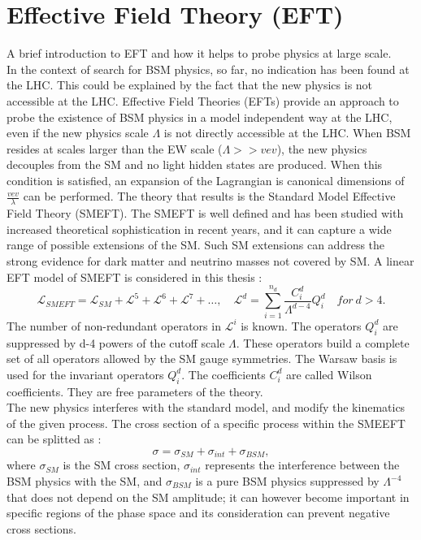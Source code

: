\section{Effective Field Theory (EFT)}
\label{chap1:EFT}
A brief introduction to EFT and how it helps to probe physics at large scale.\\

In the context of search for BSM physics, so far, no indication has been found at the LHC. This could be explained by the fact that the new physics is not accessible at the LHC. Effective Field Theories (EFTs) provide an approach to probe the existence of BSM physics in a model independent way at the LHC, even if the new physics scale $\Lambda$ is not directly accessible at the LHC. When BSM resides at scales larger than the EW scale ($\Lambda >> vev$), the new physics decouples from the SM and no light hidden states are produced. When this condition is satisfied, an expansion of the Lagrangian is canonical dimensions of $\frac{vev}{\lambda}$ can be performed. The theory that results is the Standard Model Effective Field Theory (SMEFT). The SMEFT is well defined and has been studied with increased theoretical sophistication in recent years, and it can capture a wide range of possible extensions of the SM. Such SM extensions can address the strong evidence for dark matter and neutrino masses not covered by SM. A linear EFT model of SMEFT is considered in this thesis : 
\begin{equation}
    \mathcal{L}_{S M E F T}=\mathcal{L}_{S M}+\mathcal{L}^{5}+\mathcal{L}^{6}+\mathcal{L}^{7}+\ldots, \quad \mathcal{L}^{d}=\sum_{i=1}^{n_{d}} \frac{C_{i}^{d}}{\Lambda^{d-4}} Q_{i}^{d} \quad for \ d>4.
\end{equation}
The number of non-redundant operators in $\mathcal{L}^i$ is known. The operators $Q_i^d$ are suppressed by d-4 powers of the cutoff scale $\Lambda$. These operators build a complete set of all operators allowed by the SM gauge symmetries. The Warsaw basis is used for the invariant operators $Q_i^d$. The coefficients $C_i^d$ are called Wilson coefficients. They are free parameters of the theory. \\
The new physics interferes with the standard model, and modify the kinematics of the given process. The cross section of a specific process within the SMEEFT can be splitted as : 
\begin{equation}
    \sigma = \sigma_{SM} + \sigma_{int} + \sigma_{BSM},
\end{equation}
where $\sigma_{SM}$ is the SM cross section, $\sigma_{int}$ represents the interference between the BSM physics with the SM, and $\sigma_{BSM}$ is a pure BSM physics suppressed by $\Lambda^{-4}$ that does not depend on the SM amplitude; it can however become important in specific regions of the phase space and its consideration can prevent negative cross sections. \\

